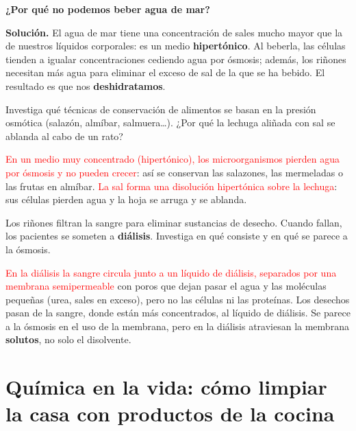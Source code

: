 \begin{example}
    \textbf{¿Por qué no podemos beber agua de mar?}

    \textbf{Solución.} El agua de mar tiene una concentración de sales mucho mayor que la de nuestros líquidos corporales: es un
    medio \textbf{hipertónico}. Al beberla, las células tienden a igualar concentraciones cediendo agua por ósmosis; además, los
    riñones necesitan más agua para eliminar el exceso de sal de la que se ha bebido. El resultado es que nos
    \textbf{deshidratamos}.
\end{example}

\begin{exercise}
    Investiga qué técnicas de conservación de alimentos se basan en la presión osmótica (salazón, almíbar, salmuera…). ¿Por qué
    la lechuga aliñada con sal se ablanda al cabo de un rato?
    \begin{solu}
        \textcolor{red}{En un medio muy concentrado (hipertónico), los microorganismos pierden agua por ósmosis y no pueden
        crecer}: así se conservan las salazones, las mermeladas o las frutas en almíbar. \textcolor{red}{La sal forma una disolución
        hipertónica sobre la lechuga}: sus células pierden agua y la hoja se arruga y se ablanda.
    \end{solu}
\end{exercise}

\begin{exercise}
    Los riñones filtran la sangre para eliminar sustancias de desecho. Cuando fallan, los pacientes se someten a
    \textbf{diálisis}. Investiga en qué consiste y en qué se parece a la ósmosis.
    \begin{solu}
        \textcolor{red}{En la diálisis la sangre circula junto a un líquido de diálisis, separados por una membrana semipermeable}
        con poros que dejan pasar el agua y las moléculas pequeñas (urea, sales en exceso), pero no las células ni las proteínas.
        Los desechos pasan de la sangre, donde están más concentrados, al líquido de diálisis. Se parece a la ósmosis en el uso de
        la membrana, pero en la diálisis atraviesan la membrana \textbf{solutos}, no solo el disolvente.
    \end{solu}
\end{exercise}

\section{Química en la vida: cómo limpiar la casa con productos de la cocina}\label{sec:ud2-limpieza}

